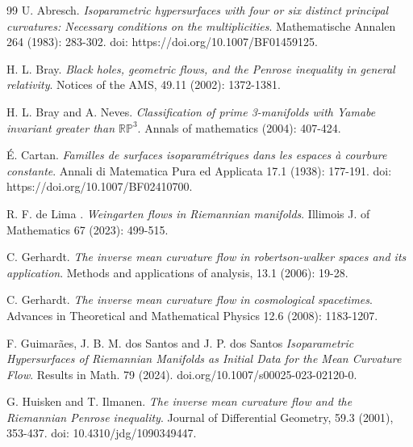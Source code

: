 \documentclass[11pt,a4paper,reqno]{amsproc}
\numberwithin{equation}{section}
\begin{document}
\begin{thebibliography}{99}
 U. Abresch. {\it{Isoparametric hypersurfaces with four or six distinct principal curvatures: Necessary conditions on the
multiplicities}}. Mathematische Annalen 264 (1983): 283-302. doi:
https://doi.org/10.1007/BF01459125.

 H. L. Bray. {\it {Black holes, geometric flows, and the
Penrose inequality in general relativity}}. Notices of the AMS, 49.11
(2002): 1372-1381.


 H. L. Bray and A. Neves. {\it {Classification of prime
3-manifolds with Yamabe invariant greater than $\mathbb{R}
\mathbb{P}^{3}$}}. Annals of mathematics (2004): 407-424.

 É. Cartan. {\it {Familles de surfaces isoparamétriques
dans les espaces à courbure constante}}. Annali di Matematica Pura ed
Applicata 17.1 (1938): 177-191. doi: https://doi.org/10.1007/BF02410700.



 R. F. de Lima . {\it Weingarten flows in Riemannian manifolds}. Illimois J. of Mathematics 67 (2023): 499-515.   


 C. Gerhardt. {\it {The inverse mean curvature flow in
robertson-walker spaces and its application}}. Methods and applications
of analysis, 13.1 (2006): 19-28.

 C. Gerhardt. {\it{The inverse mean curvature flow in
cosmological spacetimes}}. Advances in Theoretical and Mathematical Physics
12.6 (2008): 1183-1207.

 F. Guimar\~aes, J. B. M. dos Santos and  J. P. dos Santos {\it Isoparametric Hypersurfaces of Riemannian Manifolds as Initial Data for the Mean Curvature Flow}. Results in Math. 79 (2024).
doi.org/10.1007/s00025-023-02120-0. 

 G. Huisken and T. Ilmanen. {\it {The inverse mean curvature
flow and the Riemannian Penrose inequality}}. Journal of Differential
Geometry, 59.3 (2001), 353-437. doi: 10.4310/jdg/1090349447.


\end{thebibliography}
\end{document}
